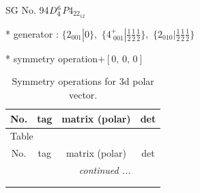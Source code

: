 \documentclass[fleqn,8pt]{jsarticle}
\begin{document}
\setcounter{MaxMatrixCols}{32}

\renewcommand{\tablename}{Table~}
\renewcommand{\figurename}{Figure~}
\begin{center}
\LARGE
SG No. 94\quad$D_{\rm 4}^{6}$\quad$P4_22_12$\quad[ tetragonal ]
\end{center}

* generator : $\{2{}_{001}|0\},\,\,\{4^{+}_{\,\,001}|\frac{1}{2} \frac{1}{2} \frac{1}{2}\},\,\,\{2{}_{010}|\frac{1}{2} \frac{1}{2} \frac{1}{2}\}$

* symmetry operation\quad$+\left[ 0,\, 0,\, 0 \right]$
\renewcommand{\arraystretch}{1.3}
\begin{longtable}{cccc}
\caption{Symmetry operations for 3d polar vector.}
 \\
 \hline \hline
No. & tag & matrix (polar) & det \\ \hline \endfirsthead

\multicolumn{3}{l}{\tablename\ \thetable{}} \\
 \hline \hline
No. & tag & matrix (polar) & det \\ \hline \endhead

 \hline \hline
\multicolumn{3}{r}{\footnotesize\it continued ...} \\ \endfoot

 \hline \hline
\multicolumn{3}{r}{} \\ \endlastfoot


\end{longtable}
\end{document}

